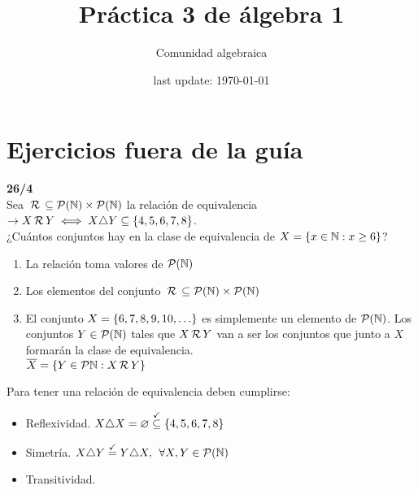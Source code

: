 






\pagestyle{empty} %

\title{Práctica 3 de álgebra 1} %
\author{Comunidad algebraica} %
\date{last update: \today} %
\section*{Ejercicios fuera de la guía}
\textbf{26/4}\\
Sea $\,\mathcal{R}\, \subseteq \mathcal P(\mathbb N) \times \mathcal P(\mathbb N)$ la relación de equivalencia
$\to X \,\mathcal{R}\, Y \iff X \triangle Y \subseteq \left\{ 4,5,6,7,8 \right\}$.\\
¿Cuántos conjuntos hay en la clase de equivalencia de $X = \left\{ x \in \mathbb N : x \geq 6 \right\}$?

\separadorCorto

\begin{enumerate}
	\item La relación toma valores de $\mathcal P(\mathbb N)$

	\item Los elementos del conjunto $\,\mathcal{R}\, \subseteq \mathcal P(\mathbb N) \times \mathcal P(\mathbb N)$

	\item El conjunto $X = \set{\foreach \i in {6,...,10}{\i, }\dots}$ es simplemente un elemento de $\mathcal P(\mathbb N)$.
	      Los conjuntos $Y \in \mathcal P(\mathbb N)$ tales que $X \,\mathcal{R}\, Y$ van a ser los conjuntos que junto a $X$ formarán la
	      clase de equivalencia.\\
	      $ \overline{X} = \left\{ Y \in \mathcal P{\mathbb N} : X \,\mathcal{R}\, Y \right\}$
\end{enumerate}

Para tener una relación de equivalencia deben cumplirse:
\begin{itemize}
	\item Reflexividad. $X \triangle X = \varnothing \stackrel{\checkmark}\subseteq \left\{ 4,5,6,7,8 \right\}$
	\item Simetría. $X \triangle Y \stackrel{\checkmark}= Y \triangle X,\, \;\forall X,Y \in \mathcal P(\mathbb N)$
	\item Transitividad.
\end{itemize}

